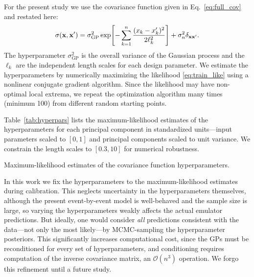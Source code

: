 \documentclass[aps,prc,reprint,superscriptaddress,amsmath]{revtex4-1}
\begin{document}
For the present study we use the covariance function given in Eq.~\eqref{eq:full_cov} and restated here:
\begin{equation*}
  \sigma(\mathbf x, \mathbf x') = \sigma_\text{GP}^2 \exp\Biggl[ -\sum_{k=1}^n \frac{(x_k - x'_k)^2}{2\ell_k^2} \Biggr] + \sigma_n^2\delta_{\mathbf x\mathbf x'}.
\end{equation*}
The hyperparameter $\sigma^2_\text{GP}$ is the overall variance of the Gaussian process and the $\ell_k$ are the independent length scales for each design parameter.
We estimate the hyperparameters by numerically maximizing the likelihood \eqref{eq:train_like} using a nonlinear conjugate gradient algorithm.
Since the likelihood may have non-optimal local extrema, we repeat the optimization algorithm many times (minimum 100) from different random starting points.

Table~\ref{tab:hyperpars} lists the maximum-likelihood estimates of the hyperparameters for each principal component in standardized units---input parameters scaled to $[0, 1]$ and principal components scaled to unit variance.
We constrain the length scales to $[0.3, 10]$ for numerical robustness.

\begin{table}
  \caption{
    \label{tab:hyperpars}
    Maximum-likelihood estimates of the covariance function hyperparameters.
  }
  
\end{table}

In this work we fix the hyperparameters to the maximum-likelihood estimates during calibration.
This neglects uncertainty in the hyperparameters themselves, although the present event-by-event model is well-behaved and the sample size is large, so varying the hyperparameters weakly affects the actual emulator predictions.
But ideally, one would consider \emph{all} predictions consistent with the data---not only the most likely---by MCMC-sampling the hyperparameter posteriors.
This significantly increases computational cost, since the GPs must be reconditioned for every set of hyperparameters, and conditioning requires computation of the inverse covariance matrix, an $\mathcal O(n^3)$ operation.
We forgo this refinement until a future study.





\end{document}
